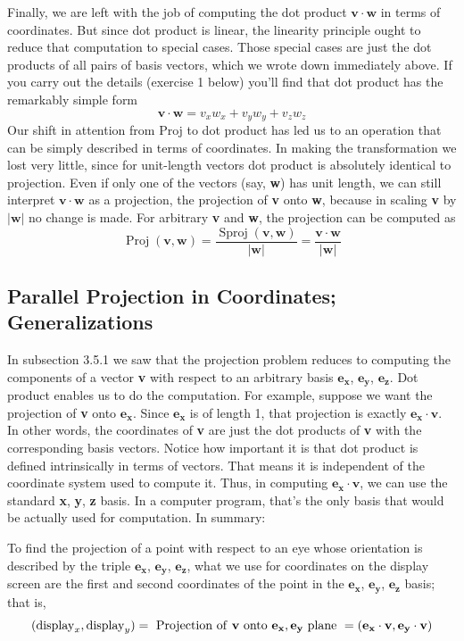 \documentclass{book}
\begin{document}
Finally, we are left with the job of computing the dot product $\mathbf{v} \cdot \mathbf{w}$ in
terms of coordinates. But since dot product is linear, the linearity
principle ought to reduce that computation to special cases. Those
special cases are just the dot products of all pairs of basis vectors, which
we wrote down immediately above. If you carry out the details (exercise
1 below) you'll find that dot product has the remarkably simple form
$$\mathbf{v} \cdot \mathbf{w} = v_xw_x + v_yw_y + v_zw_z$$
 Our shift in attention from Proj to dot product has led us to an operation that can be simply described in terms of coordinates. In making
the transformation we lost very little, since for unit-length vectors dot
product is absolutely identical to projection. Even if only one of the
vectors (say, \textbf{w}) has unit length, we can still interpret $\mathbf{v} \cdot  \mathbf{w}$ as a projection, the projection of \textbf{v} onto \textbf{w}, because in scaling \textbf{v} by $|\mathbf{w}|$ no change
is made. For arbitrary \textbf{v} and \textbf{w}, the projection can be computed as
$$\operatorname{Proj}(\mathbf{v}, \mathbf{w}) = \frac{\operatorname{Sproj}(\mathbf{v}, \mathbf{w})}{|\mathbf{w}|} = \frac{\mathbf{v} \cdot \mathbf{w}}{|\mathbf{w}|} $$

\subsection{Parallel Projection in Coordinates; Generalizations}

In subsection 3.5.1 we saw that the projection problem reduces to computing the components of a vector \textbf{v} with respect to an arbitrary basis
$\mathbf{e_x}$, $\mathbf{e_y}$, $\mathbf{e_z}$. Dot product enables us to do the computation. For example,
suppose we want the projection of \textbf{v} onto $\mathbf{e_x}$. Since $\mathbf{e_x}$ is of length 1,
that projection is exactly $\mathbf{e_x} \cdot \mathbf{v}$. In other words, the coordinates of \textbf{v} are
just the dot products of \textbf{v} with the corresponding basis vectors.
Notice how important it is that dot product is defined intrinsically in
terms of vectors. That means it is independent of the coordinate system 
used to compute it. Thus, in computing $\mathbf{e_x} \cdot \mathbf{v}$, we can use the standard
\textbf{x}, \textbf{y}, \textbf{z} basis. In a computer program, that's the only basis that would be
actually used for computation. In summary:

To find the projection of a point with respect to an eye whose orientation
is described by the triple $\mathbf{e_x}$, $\mathbf{e_y}$, $\mathbf{e_z}$, what we use for coordinates on the
display screen are the first and second coordinates of the point in the
$\mathbf{e_x}$, $\mathbf{e_y}$, $\mathbf{e_z}$ basis; that is,
$$(\operatorname{display}_x, \operatorname{display}_y) = \text{ Projection of \textbf{v} onto }\mathbf{e_x}, \mathbf{e_y} \text{ plane } = (\mathbf{e_x} \cdot \mathbf{v}, \mathbf{e_y} \cdot \mathbf{v})$$
\end{document}
